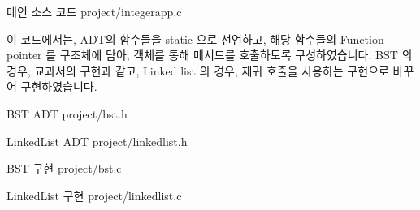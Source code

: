 \documentclass {article}
\begin{document}
메인 소스 코드
{project/integerapp.c}

이 코드에서는, ADT의 함수들을 static 으로 선언하고, 해당 함수들의 Function pointer 를 구조체에 담아, 객체를 통해 메서드를 호출하도록 구성하였습니다. BST 의 경우, 교과서의 구현과 같고, Linked list 의 경우, 재귀 호출을 사용하는 구현으로 바꾸어 구현하였습니다.

BST ADT
{project/bst.h}

LinkedList ADT
{project/linkedlist.h}

BST 구현
{project/bst.c}

LinkedList 구현
{project/linkedlist.c}
\end{document}
